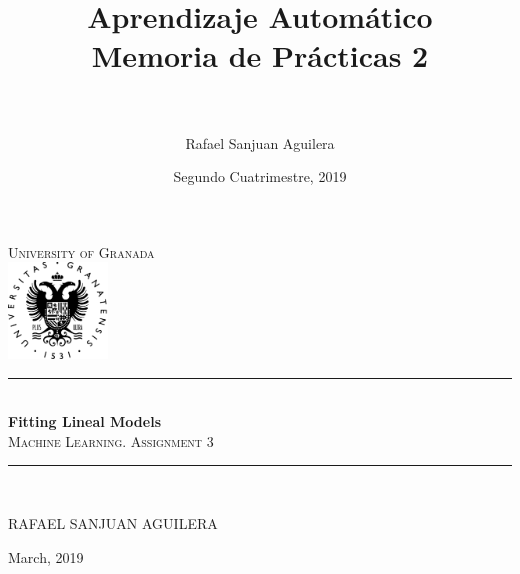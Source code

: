 \documentclass{article}
\title{
  \textbf{\HUGE Aprendizaje Automático} \\
  \large Memoria de Prácticas 2
}
\author{\\\\Rafael Sanjuan Aguilera}
\date{Segundo Cuatrimestre, 2019}
\newcommand{\HRule}{\rule{\linewidth}{0.5mm}}
\begin{document}

\begin{titlepage}
\begin{center}

\textsc{\LARGE University of Granada}\\[1.5cm] %

\includegraphics[width=100px]{figures/ugrlogo.png}


\vfill
\HRule \\[0.4cm]
{\huge \bfseries Fitting Lineal Models}\\[0.4cm]
\textsc{\Large Machine Learning. Assignment 3}\\[0.5cm]
\HRule \\[1.5cm]
 

\begin{center}
    \textsc{RAFAEL SANJUAN AGUILERA} \\
\end{center}

\vfill
{\large March, 2019}\\[4cm] %

\vfill
\end{center}

\end{titlepage}

\newpage
\tableofcontents





~\\
~\\
~\\
\newpage



\end{document}
